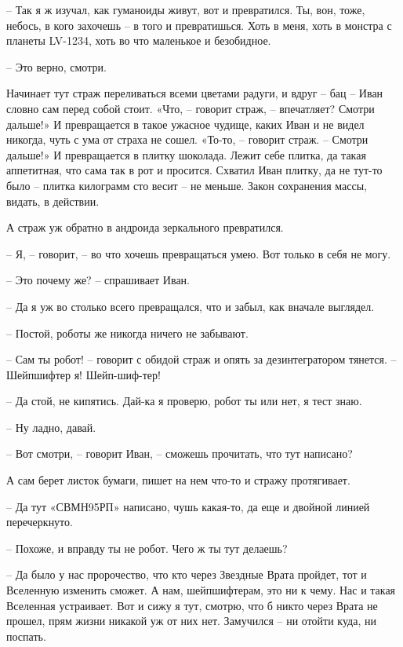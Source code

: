 \documentclass[ebook,oneside,final,openright]{memoir}
\begin{document}
– Так я ж изучал, как гуманоиды живут, вот и превратился. Ты, вон, тоже, небось, в кого захочешь – в того и превратишься. Хоть в меня, хоть в монстра с планеты LV-1234, хоть во что маленькое и безобидное. \par
– Это верно, смотри. \par
\par
Начинает тут страж переливаться всеми цветами радуги, и вдруг – бац – Иван словно сам перед собой стоит. «Что, – говорит страж, – впечатляет? Смотри дальше!» И превращается в такое ужасное чудище, каких Иван и не видел никогда, чуть с ума от страха не сошел. «То-то, – говорит страж. – Смотри дальше!» И превращается в плитку шоколада. Лежит себе плитка, да такая аппетитная, что сама так в рот и просится. Схватил Иван плитку, да не тут-то было – плитка килограмм сто весит – не меньше. Закон сохранения массы, видать, в действии. \par
\par
А страж уж обратно в андроида зеркального превратился. \par
– Я, – говорит, – во что хочешь превращаться умею. Вот только в себя не могу. \par
– Это почему же? – спрашивает Иван.\par
– Да я уж во столько всего превращался, что и забыл, как вначале выглядел. \par
– Постой, роботы же никогда ничего не забывают. \par
– Сам ты робот! – говорит с обидой страж и опять за дезинтегратором тянется. – Шейпшифтер я! Шейп-шиф-тер! \par
– Да стой, не кипятись. Дай-ка я проверю, робот ты или нет, я тест знаю. \par
– Ну ладно, давай. \par
– Вот смотри, – говорит Иван, – сможешь прочитать, что тут написано? \par
А сам берет листок бумаги, пишет на нем что-то и стражу протягивает. \par
– Да тут «СВМН95РП» написано, чушь какая-то, да еще и двойной линией перечеркнуто.\par
– Похоже, и вправду ты не робот. Чего ж ты тут делаешь? \par
– Да было у нас пророчество, что кто через Звездные Врата пройдет, тот и Вселенную изменить сможет. А нам, шейпшифтерам, это ни к чему. Нас и такая Вселенная устраивает. Вот и сижу я тут, смотрю, что б никто через Врата не прошел, прям жизни никакой уж от них нет. Замучился – ни отойти куда, ни поспать. \par
\end{document}
